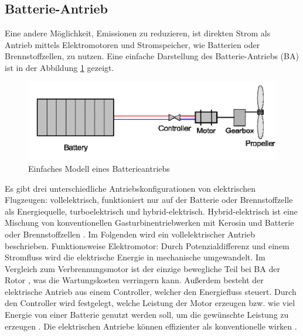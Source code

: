 \subsection{Batterie-Antrieb}
Eine andere Möglichkeit, Emissionen zu reduzieren, ist direkten Strom als Antrieb mittels Elektromotoren und Stromspeicher, wie Batterien oder Brennstoffzellen, zu nutzen.
Eine einfache Darstellung des Batterie-Antriebs (BA) ist in der Abbildung \ref{ba} gezeigt.
%
\begin{figure}[h]
	\centering
	\includegraphics[width=0.7\linewidth]{Bilder/BA.png}
	\caption[Einfaches Modell eines Batterieantriebs]{Einfaches Modell eines Batterieantriebs \cite{hepperle2012electric}}
	\label{ba}
\end{figure}

Es gibt drei unterschiedliche Antriebskonfigurationen von elektrischen Flugzeugen: vollelektrisch, funktioniert nur auf der Batterie oder
Brennstoffzelle als Energiequelle, turboelektrisch und hybrid-elektrisch. Hybrid-elektrisch ist eine Mischung von konventionellen 
Gasturbinentriebwerken mit Kerosin und Batterie oder Brennstoffzellen \cite{dahal2021techno}. %
Im Folgenden wird ein vollelektrischer Antrieb beschrieben.
%
Funktionsweise Elektromotor: Durch Potenzialdifferenz und einem Stromfluss wird die elektrische Energie in mechanische umgewandelt.
Im Vergleich zum Verbrennungsmotor ist der einzige bewegliche Teil bei BA der Rotor \cite{donckers2024electric}, 
was die Wartungskosten verringern kann. Außerdem besteht der elektrische Antrieb aus einem Controller, welcher den Energiefluss steuert. 
Durch den Controller wird festgelegt, welche Leistung der Motor erzeugen bzw. wie viel Energie von 
einer Batterie genutzt werden soll, um die gewünschte Leistung zu erzeugen \cite{donckers2024electric}. 
Die elektrischen Antriebe können effizienter als konventionelle wirken \cite{hepperle2012electric}.

